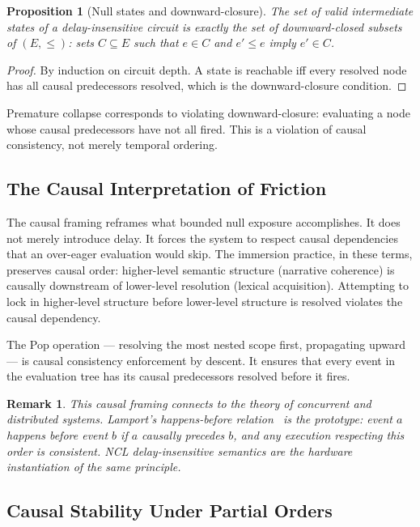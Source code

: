 \documentclass[11pt]{article}
\newtheorem{proposition}{Proposition}
\newtheorem{remark}{Remark}
\theoremstyle{remark}
\begin{document}
\begin{proposition}[Null states and downward-closure]
The set of valid intermediate states of a delay-insensitive circuit is exactly the set of downward-closed subsets of $(E, \leq)$: sets $C \subseteq E$ such that $e \in C$ and $e' \leq e$ imply $e' \in C$.
\end{proposition}

\begin{proof}
By induction on circuit depth. A state is reachable iff every resolved node has all causal predecessors resolved, which is the downward-closure condition.
\end{proof}

Premature collapse corresponds to violating downward-closure: evaluating a node whose causal predecessors have not all fired. This is a violation of causal consistency, not merely temporal ordering.

\subsection{The Causal Interpretation of Friction}

The causal framing reframes what bounded null exposure accomplishes. It does not merely introduce delay. It forces the system to respect causal dependencies that an over-eager evaluation would skip. The immersion practice, in these terms, preserves causal order: higher-level semantic structure (narrative coherence) is causally downstream of lower-level resolution (lexical acquisition). Attempting to lock in higher-level structure before lower-level structure is resolved violates the causal dependency.

The Pop operation --- resolving the most nested scope first, propagating upward --- is causal consistency enforcement by descent. It ensures that every event in the evaluation tree has its causal predecessors resolved before it fires.

\begin{remark}
This causal framing connects to the theory of concurrent and distributed systems. Lamport's happens-before relation~\cite{lamport} is the prototype: event $a$ happens before event $b$ if $a$ causally precedes $b$, and any execution respecting this order is consistent. NCL delay-insensitive semantics are the hardware instantiation of the same principle.
\end{remark}

\subsection{Causal Stability Under Partial Orders}
\end{document}
